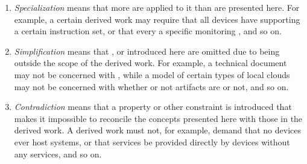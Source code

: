 \begin{enumerate}
\begin{enumerate}
	\item \textit{Specialization} means that more  are applied to it than are presented here. For example, a certain derived work may require that all devices have  supporting a certain instruction set, or that every   a specific monitoring , and so on.
	\item \textit{Simplification} means that ,  or  introduced here are omitted due to being outside the scope of the derived work. For example, a technical document may not be concerned with , while a model of certain types of local clouds may not be concerned with whether or not artifacts are  or not, and so on.
	\item \textit{Contradiction} means that a property or other constraint is introduced that makes it impossible to reconcile the concepts presented here with those in the derived work. A derived work must not, for example, demand that no devices ever host systems, or that services be provided directly by devices without any services, and so on.
	\end{enumerate}
\end{enumerate}